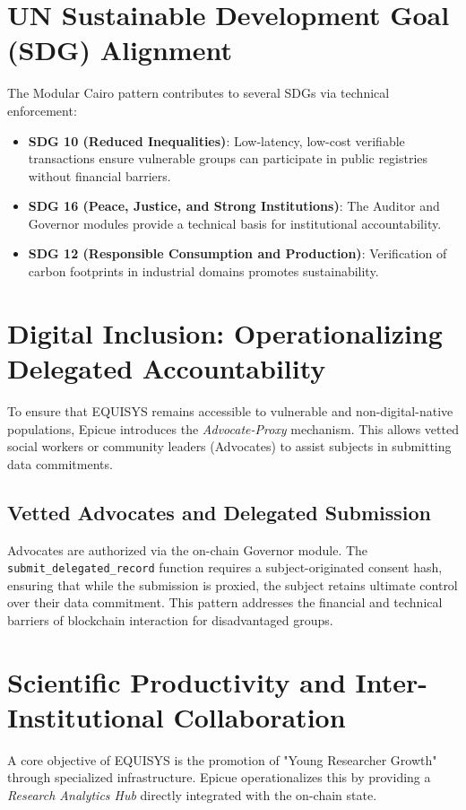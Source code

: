 \documentclass[12pt,a4paper]{article}
\begin{document}
\section{UN Sustainable Development Goal (SDG) Alignment}
The Modular Cairo pattern contributes to several SDGs via technical enforcement:
\begin{itemize}
    \item \textbf{SDG 10 (Reduced Inequalities)}: Low-latency, low-cost verifiable transactions ensure vulnerable groups can participate in public registries without financial barriers.
    \item \textbf{SDG 16 (Peace, Justice, and Strong Institutions)}: The Auditor and Governor modules provide a technical basis for institutional accountability.
    \item \textbf{SDG 12 (Responsible Consumption and Production)}: Verification of carbon footprints in industrial domains promotes sustainability.
\end{itemize}

\section{Digital Inclusion: Operationalizing Delegated Accountability}
To ensure that EQUISYS remains accessible to vulnerable and non-digital-native populations, Epicue introduces the \textit{Advocate-Proxy} mechanism. This allows vetted social workers or community leaders (Advocates) to assist subjects in submitting data commitments.

\subsection{Vetted Advocates and Delegated Submission}
Advocates are authorized via the on-chain Governor module. The \texttt{submit\_delegated\_record} function requires a subject-originated consent hash, ensuring that while the submission is proxied, the subject retains ultimate control over their data commitment. This pattern addresses the financial and technical barriers of blockchain interaction for disadvantaged groups.

\section{Scientific Productivity and Inter-Institutional Collaboration}
A core objective of EQUISYS is the promotion of "Young Researcher Growth" through specialized infrastructure. Epicue operationalizes this by providing a \textit{Research Analytics Hub} directly integrated with the on-chain state.
\end{document}
